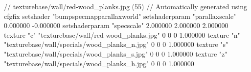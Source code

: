 // texturebase/wall/red-wood_planks.jpg (55)
// Automatically generated using cfgfix
setshader "bumpspecmapparallaxworld"
setshaderparam "parallaxscale" 0.000000 -0.000000
setshaderparam "specscale" 2.000000 2.000000 2.000000
texture "c" "texturebase/wall/red-wood_planks.jpg" 0 0 0 1.000000
texture "n" "texturebase/wall/specials/wood_planks_n.jpg" 0 0 0 1.000000
texture "s" "texturebase/wall/specials/wood_planks_s.jpg" 0 0 0 1.000000
texture "z" "texturebase/wall/specials/wood_planks_h.jpg" 0 0 0 1.000000
